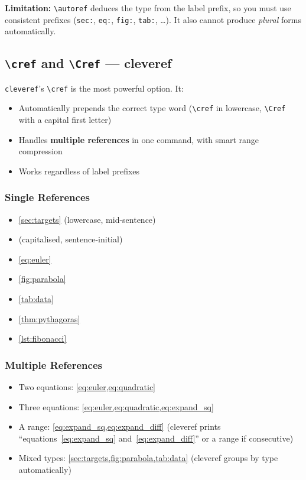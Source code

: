 \documentclass[12pt,a4paper]{article}
\begin{document}
\noindent\textbf{Limitation:} \verb|\autoref| deduces the type from the
label prefix, so you must use consistent prefixes (\texttt{sec:},
\texttt{eq:}, \texttt{fig:}, \texttt{tab:}, \ldots).  It also cannot
produce \textit{plural} forms automatically.

\subsection{\texttt{\textbackslash cref} and \texttt{\textbackslash Cref} — cleveref}
\label{subsec:cref}

\texttt{cleveref}'s \verb|\cref| is the most powerful option.  It:
\begin{itemize}
    \item Automatically prepends the correct type word (\verb|\cref| in
          lowercase, \verb|\Cref| with a capital first letter)
    \item Handles \textbf{multiple references} in one command, with smart
          range compression
    \item Works regardless of label prefixes
\end{itemize}

\subsubsection{Single References}

\begin{itemize}
    \item \cref{sec:targets} \quad (lowercase, mid-sentence)
    \item {} \quad (capitalised, sentence-initial)
    \item \cref{eq:euler}
    \item \cref{fig:parabola}
    \item \cref{tab:data}
    \item \cref{thm:pythagoras}
    \item \cref{lst:fibonacci}
\end{itemize}

\subsubsection{Multiple References}

\begin{itemize}
    \item Two equations: \cref{eq:euler,eq:quadratic}
    \item Three equations: \cref{eq:euler,eq:quadratic,eq:expand_sq}
    \item A range: \cref{eq:expand_sq,eq:expand_diff}
          (cleveref prints ``equations~\ref{eq:expand_sq}
           and~\ref{eq:expand_diff}'' or a range if consecutive)
    \item Mixed types: \cref{sec:targets,fig:parabola,tab:data}
          (cleveref groups by type automatically)
\end{itemize}
\end{document}
